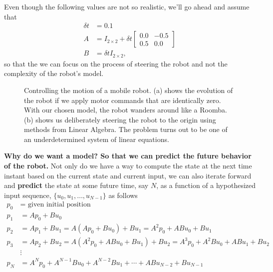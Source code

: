 Even though the following values are not so realistic, we'll go ahead and assume that
\begin{equation}
    \begin{aligned}
    \delta t &= 0.1 \\
    A &= I_{2 \times 2} + \delta t \left[ \begin{array}{rr} 0.0 & -0.5 \\ 0.5 & 0.0 \end{array}  \right] \\
    B&= \delta t I_{2 \times 2},
    \end{aligned}
\end{equation}
so that the we can focus on the process of steering the robot and not the complexity of the robot's model. \\

\begin{figure}[h]%
\centering
{}
\hspace{5pt}%
%
\caption[]{Controlling the motion of a mobile robot. (a) shows the evolution of the robot if we apply motor commands that are identically zero. With our chosen model, the robot wanders around like a Roomba.  (b) shows us deliberately steering the robot to the origin using methods from Linear Algebra. The problem turns out to be one of an underdetermined system of linear equations. }
    \label{fig:MobileRobotTrajectories}
\end{figure}

\newpage

\textbf{Why do we want a model? So that we can predict the future behavior of the robot.} Not only do we have a way to compute the state at the next time instant based on the current state and current input, we can also iterate forward and \textbf{predict} the state at some future time, say $N$, as a function of a hypothesized input sequence, $\{u_0, u_1, \ldots, u_{N-1} \}$ as follows
\begin{equation}
    \label{eq:MobileRobotFutureStates}
\begin{aligned}
    p_0 &= \text{ given initial position} \nonumber\\
    p_1 &= A p_0 + B u_0 \nonumber\\
    p_2 &= A p_1 + B u_1 = A(A p_0 + B u_0 ) + B u_1 = A^2 p_0 + A B u_0 + B u_1 \nonumber\\
    p_3 &= A p_2 + B u_2 = A(A^2 p_0 + A B u_0 + B u_1) + B u_2 = A^3 p_0 + A^2 B u_0 + A B u_1 + B u_2 \nonumber\\
    &\vdots \nonumber\\
    p_N &= A^N p_0 + A^{N-1} B u_0 + A^{N-2} B u_1 + \cdots + A B u_{N-2} + B u_{N-1}
\end{aligned}
\end{equation}

